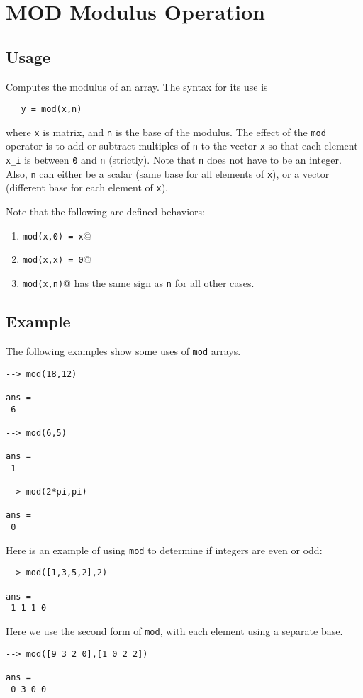 \section{MOD Modulus Operation}

\subsection{Usage}

Computes the modulus of an array.  The syntax for its use is
\begin{verbatim}
   y = mod(x,n)
\end{verbatim}
where \verb|x| is matrix, and \verb|n| is the base of the modulus.  The
effect of the \verb|mod| operator is to add or subtract multiples of \verb|n|
to the vector \verb|x| so that each element \verb|x_i| is between \verb|0| and \verb|n|
(strictly).  Note that \verb|n| does not have to be an integer.  Also,
\verb|n| can either be a scalar (same base for all elements of \verb|x|), or a
vector (different base for each element of \verb|x|).

Note that the following are defined behaviors:
\begin{enumerate}
\item  \verb|mod(x,0) = x|@

\item  \verb|mod(x,x) = 0|@

\item  \verb|mod(x,n)|@ has the same sign as \verb|n| for all other cases.

\end{enumerate}
\subsection{Example}

The following examples show some uses of \verb|mod|
arrays.
\begin{verbatim}
--> mod(18,12)

ans = 
 6 

--> mod(6,5)

ans = 
 1 

--> mod(2*pi,pi)

ans = 
 0 
\end{verbatim}
Here is an example of using \verb|mod| to determine if integers are even
 or odd:
\begin{verbatim}
--> mod([1,3,5,2],2)

ans = 
 1 1 1 0 
\end{verbatim}
Here we use the second form of \verb|mod|, with each element using a 
separate base.
\begin{verbatim}
--> mod([9 3 2 0],[1 0 2 2])

ans = 
 0 3 0 0 
\end{verbatim}
